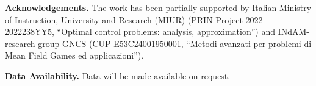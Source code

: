 \documentclass{article}
\begin{document}
\vspace{1cm}

{\bf Acknowledgements.} The work has been partially supported by Italian Ministry of
Instruction, University and Research (MIUR) (PRIN Project 2022 2022238YY5, “Optimal control problems: analysis, approximation”) and INdAM-research group GNCS (CUP E53C24001950001,
“Metodi avanzati per problemi di Mean Field Games ed applicazioni”).

\vspace{5mm}

{\bf Data Availability.} Data will be made available on request.

\vspace{1cm}



\end{document}
